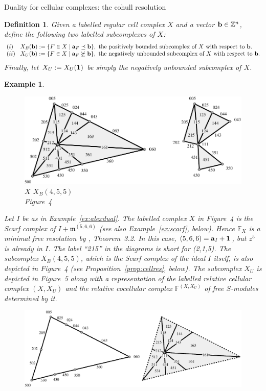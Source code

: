 \documentclass[12pt,leqno]{article}
\newtheorem{defn}[thm]{Definition}
\newtheorem{example}[thm]{Example}
\def\aa{{{\rm \bf a}}}
\def\bb{{{\rm \bf b}}}
\def\mm{{\mathfrak m}}
\def\FF{{\mathbb F}}
\def\ZZ{{\mathbb Z}}
\begin{document}
\begin{section}{Duality for cellular complexes: the cohull resolution}
\begin{defn}
Given a labelled regular cell complex $X$ and a vector $\bb \in \ZZ^n$,
define the following two labelled subcomplexes of $X$:
$$
\begin{array}{ll}
\!(i)	&
	X_B(\bb) := \{F \in X \mid \aa_F \preceq \bb \},\hbox{\rm\ the
	positively bounded subcomplex of $X$ with respect to $\bb$}.\!\!
\cr
\!(ii)\!&
	X_U(\bb) := \{F \in X \mid \aa_F \not\succeq \bb \},
	\hbox{\rm\ the negatively unbounded subcomplex of $X$ with
	respect to $\bb$}.\!\!
\end{array}
$$
Finally, let $X_U := X_U({\bf 1})$ be simply {\rm the negatively
unbounded subcomplex of $X$}.
\end{defn}
\begin{example}\rm 
\begin{figure}[htb] \label{fig:bounded}
\centering
\includegraphics{bound}\\
\hskip 1in $X$ \hskip 3in $X_B(4,5,5)$\\
Figure~4
\end{figure}
Let $I$ be as in Example~\ref{ex:alexdual}.  The labelled complex $X$ in
Figure~4 is the {\it Scarf complex} \cite{BPS} of $I + \mm^{(5,6,6)}$
(see also Example~\ref{ex:scarf}, below).  Hence $\FF_X$ is a minimal
free resolution by \cite{BPS}, Theorem~3.2.  In this case, $(5,6,6) =
\aa_I + {\bf 1}$, but $z^5$ is already in $I$.  The label ``215'' in the
diagrams is short for (2,1,5).  The subcomplex $X_B(4,5,5)$, which is the
Scarf complex of the ideal $I$ itself, is also depicted in Figure~4 (see
Proposition~\ref{prop:cellres}, below).  The subcomplex $X_U$ is depicted
in Figure~5 along with a representation of the labelled relative cellular
complex $(X,X_U)$ and the relative cocellular complex $\FF^{(X,X_U)}$ of
free $S$-modules determined by it.
\begin{figure}[!htb] \label{fig:unbounded}
\centering
\includegraphics{unbound}\\

\end{figure}
\end{example}
\end{section}
\end{document}
